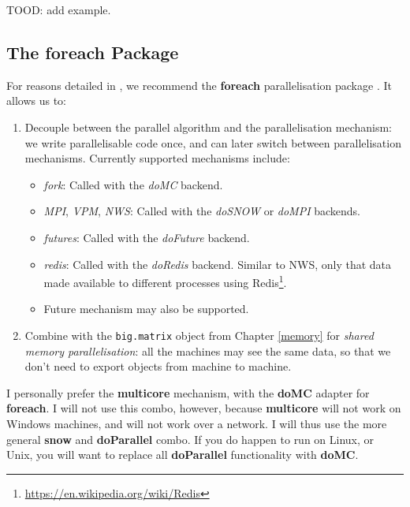 \documentclass[]{book}
\providecommand{\tightlist}{%
  \setlength{\itemsep}{0pt}\setlength{\parskip}{0pt}}
\renewcommand{\href}[2]{#2\footnote{\url{#1}}}
\theoremstyle{definition}
\theoremstyle{definition}
\theoremstyle{definition}
\theoremstyle{remark}
\let\BeginKnitrBlock\begin \let\EndKnitrBlock\end
\begin{document}
TOOD: add example.

\hypertarget{the-foreach-package}{%
\subsection{The foreach Package}\label{the-foreach-package}}

For reasons detailed in \citet{kane2013scalable}, we recommend the \textbf{foreach} parallelisation package \citep{foreach}.
It allows us to:

\begin{enumerate}
\def\labelenumi{\arabic{enumi}.}
\item
  Decouple between the parallel algorithm and the parallelisation mechanism: we write parallelisable code once, and can later switch between parallelisation mechanisms.
  Currently supported mechanisms include:

  \begin{itemize}
  \tightlist
  \item
    \emph{fork}: Called with the \emph{doMC} backend.
  \item
    \emph{MPI}, \emph{VPM}, \emph{NWS}: Called with the \emph{doSNOW} or \emph{doMPI} backends.
  \item
    \emph{futures}: Called with the \emph{doFuture} backend.
  \item
    \emph{redis}: Called with the \emph{doRedis} backend. Similar to NWS, only that data made available to different processes using \href{https://en.wikipedia.org/wiki/Redis}{Redis}.
  \item
    Future mechanism may also be supported.
  \end{itemize}
\item
  Combine with the \texttt{big.matrix} object from Chapter \ref{memory} for \emph{shared memory parallelisation}: all the machines may see the same data, so that we don't need to export objects from machine to machine.
\end{enumerate}

\BeginKnitrBlock{remark}
{}I personally prefer the \textbf{multicore} mechanism, with the \textbf{doMC} adapter for \textbf{foreach}.
I will not use this combo, however, because \textbf{multicore} will not work on Windows machines, and will not work over a network.
I will thus use the more general \textbf{snow} and \textbf{doParallel} combo.
If you do happen to run on Linux, or Unix, you will want to replace all \textbf{doParallel} functionality with \textbf{doMC}.
\EndKnitrBlock{remark}
\end{document}
